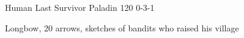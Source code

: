 \begin{filledCS}%
  {\composeHumanName}%
  {Human}%
  {Last Survivor}%
  {Paladin}%
  {{1}{2}{0}}%
  {{0}{-3}{-1}}%
  {%
    \setcounter{Cultivation}{2}
    \setcounter{Performance}{1}
    \setcounter{Stealth}{1}
    \setcounter{Brawl}{1}
    \setcounter{Projectiles}{1}
    \Dagger
    \addtocounter{equipmentWeight}{3}
  }%
  {\unstoppable}%
  {Longbow, 20 arrows, sketches of bandits who raised his \gls{village}}%

  \renewcommand\rank{Fodder}
  \renewcommand\characterDebt{100 \glspl{sp}}

\end{filledCS}

